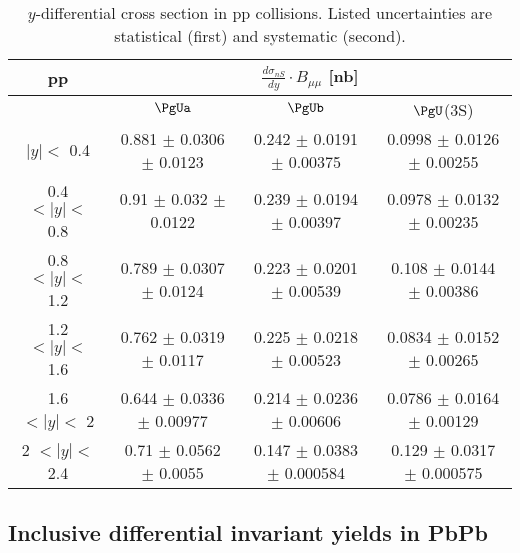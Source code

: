 \begin{table}[htp]
\begin{centering}
\begin{tabular}{|c|c|c|c|}                                      
\hline
pp %
&  \multicolumn{3}{c}{$\frac{d\sigma_{nS}}{dy}\cdot B_{\mu\mu}$ [nb]} \vline\\
\hline
 &  $\PgUa$ & $\PgUb$ &  $\PgU$(3S) \\  
 $|y| <$ 0.4        & 0.881 $\pm$ 0.0306 $\pm$ 0.0123  & 0.242 $\pm$ 0.0191 $\pm$ 0.00375  &  0.0998 $\pm$ 0.0126 $\pm$ 0.00255  \\
 0.4 $< |y| <$ 0.8  & 0.91 $\pm$ 0.032 $\pm$ 0.0122    & 0.239 $\pm$ 0.0194 $\pm$ 0.00397  &  0.0978 $\pm$ 0.0132 $\pm$ 0.00235  \\
 0.8 $< |y| <$ 1.2  & 0.789 $\pm$ 0.0307 $\pm$ 0.0124  & 0.223 $\pm$ 0.0201 $\pm$ 0.00539  &  0.108 $\pm$ 0.0144 $\pm$ 0.00386    \\
 1.2 $< |y| <$ 1.6  & 0.762 $\pm$ 0.0319 $\pm$ 0.0117  & 0.225 $\pm$ 0.0218 $\pm$ 0.00523  &  0.0834 $\pm$ 0.0152 $\pm$ 0.00265   \\
 1.6 $< |y| <$ 2    & 0.644 $\pm$ 0.0336 $\pm$ 0.00977 & 0.214 $\pm$ 0.0236 $\pm$ 0.00606  &  0.0786 $\pm$ 0.0164 $\pm$ 0.00129   \\
 2 $< |y| <$ 2.4    & 0.71 $\pm$ 0.0562 $\pm$ 0.0055   & 0.147 $\pm$ 0.0383 $\pm$ 0.000584 &  0.129 $\pm$ 0.0317 $\pm$ 0.000575  \\
\hline

\end{tabular}
\caption{$y$-differential cross section in pp collisions. Listed
uncertainties are statistical (first) and systematic (second).}  
\label{tab:CSppraptab}
\end{centering}
\end{table}

\vfill\newpage
\subsection{Inclusive differential invariant yields in PbPb}
\label{subsec:csaa}

